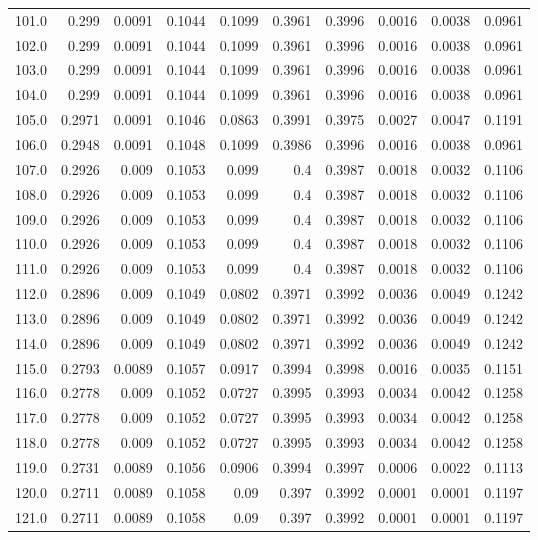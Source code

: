 \begin{longtable}{lrrrrrrrrr}
101.0 & 0.299 & 0.0091 & 0.1044 & 0.1099 & 0.3961 & 0.3996 & 0.0016 & 0.0038 & 0.0961 \\
102.0 & 0.299 & 0.0091 & 0.1044 & 0.1099 & 0.3961 & 0.3996 & 0.0016 & 0.0038 & 0.0961 \\
103.0 & 0.299 & 0.0091 & 0.1044 & 0.1099 & 0.3961 & 0.3996 & 0.0016 & 0.0038 & 0.0961 \\
104.0 & 0.299 & 0.0091 & 0.1044 & 0.1099 & 0.3961 & 0.3996 & 0.0016 & 0.0038 & 0.0961 \\
105.0 & 0.2971 & 0.0091 & 0.1046 & 0.0863 & 0.3991 & 0.3975 & 0.0027 & 0.0047 & 0.1191 \\
106.0 & 0.2948 & 0.0091 & 0.1048 & 0.1099 & 0.3986 & 0.3996 & 0.0016 & 0.0038 & 0.0961 \\
107.0 & 0.2926 & 0.009 & 0.1053 & 0.099 & 0.4 & 0.3987 & 0.0018 & 0.0032 & 0.1106 \\
108.0 & 0.2926 & 0.009 & 0.1053 & 0.099 & 0.4 & 0.3987 & 0.0018 & 0.0032 & 0.1106 \\
109.0 & 0.2926 & 0.009 & 0.1053 & 0.099 & 0.4 & 0.3987 & 0.0018 & 0.0032 & 0.1106 \\
110.0 & 0.2926 & 0.009 & 0.1053 & 0.099 & 0.4 & 0.3987 & 0.0018 & 0.0032 & 0.1106 \\
111.0 & 0.2926 & 0.009 & 0.1053 & 0.099 & 0.4 & 0.3987 & 0.0018 & 0.0032 & 0.1106 \\
112.0 & 0.2896 & 0.009 & 0.1049 & 0.0802 & 0.3971 & 0.3992 & 0.0036 & 0.0049 & 0.1242 \\
113.0 & 0.2896 & 0.009 & 0.1049 & 0.0802 & 0.3971 & 0.3992 & 0.0036 & 0.0049 & 0.1242 \\
114.0 & 0.2896 & 0.009 & 0.1049 & 0.0802 & 0.3971 & 0.3992 & 0.0036 & 0.0049 & 0.1242 \\
115.0 & 0.2793 & 0.0089 & 0.1057 & 0.0917 & 0.3994 & 0.3998 & 0.0016 & 0.0035 & 0.1151 \\
116.0 & 0.2778 & 0.009 & 0.1052 & 0.0727 & 0.3995 & 0.3993 & 0.0034 & 0.0042 & 0.1258 \\
117.0 & 0.2778 & 0.009 & 0.1052 & 0.0727 & 0.3995 & 0.3993 & 0.0034 & 0.0042 & 0.1258 \\
118.0 & 0.2778 & 0.009 & 0.1052 & 0.0727 & 0.3995 & 0.3993 & 0.0034 & 0.0042 & 0.1258 \\
119.0 & 0.2731 & 0.0089 & 0.1056 & 0.0906 & 0.3994 & 0.3997 & 0.0006 & 0.0022 & 0.1113 \\
120.0 & 0.2711 & 0.0089 & 0.1058 & 0.09 & 0.397 & 0.3992 & 0.0001 & 0.0001 & 0.1197 \\
121.0 & 0.2711 & 0.0089 & 0.1058 & 0.09 & 0.397 & 0.3992 & 0.0001 & 0.0001 & 0.1197 \\

\end{longtable}
